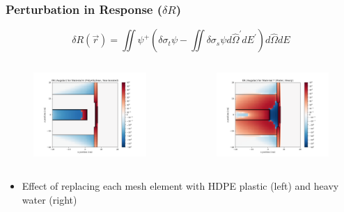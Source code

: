 \documentclass[t]{beamer}
\begin{document}
\begin{frame}
  \frametitle{Perturbation in Response ($\delta R$)}
  \vskip-0.25in
  \begin{equation*}
    \delta R\left(\vec{r}\right) = \iint\psi^+\left(\delta\sigma_t\psi - \iint\delta\sigma_s\psi d\hat{\Omega}^\prime dE^\prime\right)d\hat{\Omega}dE
  \end{equation*}
  \vskip-0.25in
  \begin{columns}
    \begin{figure}
      \includegraphics[trim={0.7in 0.15in 1.05in 0.4in},clip,scale=0.36]{images/dR_angular_06.png}
    \end{figure}
    \begin{figure}
      \includegraphics[trim={0.7in 0.15in 1.05in 0.4in},clip,scale=0.36]{images/dR_angular_07.png}
    \end{figure}
  \end{columns}
  \begin{itemize}
    \item Effect of replacing each mesh element with HDPE plastic (left) and
          heavy water (right)
  \end{itemize}
\end{frame}
\end{document}
